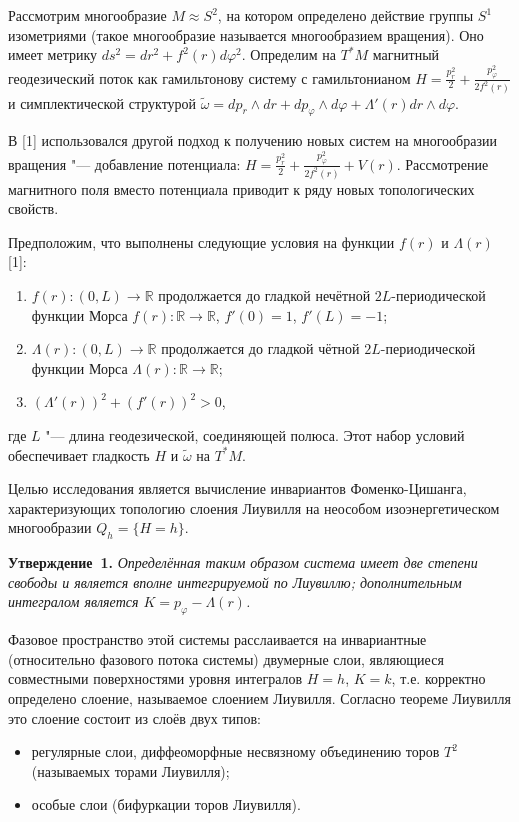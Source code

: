 \vzmscaption

Рассмотрим многообразие $M \approx S^2$, на котором определено действие группы $S^1$ изометриями (такое многообразие называется многообразием вращения). Оно имеет метрику $ds^2=dr^2+f^2(r)d\varphi^2$. Определим на $T^*M$ магнитный геодезический поток как гамильтонову систему с гамильтонианом $H = \frac{p_r^2}{2}+\frac{p_\varphi^2}{2f^2(r)}$ и симплектической структурой $\widetilde{\omega}=dp_r \wedge dr + dp_\varphi \wedge d\varphi+\Lambda'(r)dr \wedge d\varphi$.

В [1] использовался другой подход к получению новых систем на многообразии вращения "--- добавление потенциала: $H = \frac{p_r^2}{2}+\frac{p_\varphi^2}{2f^2(r)}+V(r)$. Рассмотрение магнитного поля вместо потенциала приводит к ряду новых топологических свойств.

Предположим, что выполнены следующие условия на функции $f(r)$ и $\Lambda(r)$ [1]:
\begin{enumerate}
	\item $f(r):(0,L)\to \mathbb{R}$ продолжается до гладкой нечётной $2L$-периодической функции Морса $f(r):\mathbb{R}\to \mathbb{R}$, $f'(0)=1$, $f'(L)=-1$;
	\item $\Lambda(r):(0,L)\to \mathbb{R}$ продолжается до гладкой чётной $2L$-периодической функции Морса $\Lambda(r):\mathbb{R}\to \mathbb{R}$;
	\item $(\Lambda'(r))^2+(f'(r))^2>0$,
\end{enumerate}
где $L$ "--- длина геодезической, соединяющей полюса. Этот набор условий обеспечивает гладкость $H$ и $\widetilde{\omega}$ на $T^*M$.

Целью исследования является вычисление инвариантов Фоменко-Цишанга, характеризующих топологию слоения Лиувилля на неособом изоэнергетическом многообразии $Q_h=\{H=h\}$.

\textbf{Утверждение~1.} {\it Определённая таким образом система имеет две степени свободы и является вполне интегрируемой по Лиувиллю; дополнительным интегралом является $K=p_\varphi-\Lambda(r)$.}

Фазовое пространство этой системы расслаивается на инвариантные (относительно фазового потока системы) двумерные слои, являющиеся совместными поверхностями уровня интегралов $H=h$, $K=k$, т.е. корректно определено слоение, называемое слоением Лиувилля. Согласно теореме Лиувилля это слоение состоит из слоёв двух типов:
\begin{itemize}
	\item регулярные слои, диффеоморфные несвязному объединению торов $T^2$ (называемых торами Лиувилля);
	\item особые слои (бифуркации торов Лиувилля).
\end{itemize}

